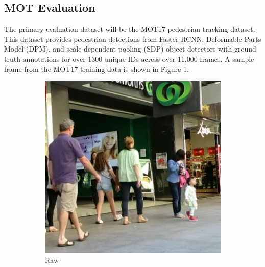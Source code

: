 \documentclass[10pt,twocolumn,letterpaper]{article}
\begin{document}
\subsection{MOT Evaluation}
The primary evaluation dataset will be the MOT17 \cite{MOT17} pedestrian tracking dataset. This dataset provides pedestrian detections from Faster-RCNN, Deformable Parts
Model (DPM), and scale-dependent pooling (SDP) object detectors with ground truth annotations for over 1300 unique IDs across over 11,000 frames. A sample frame from the MOT17 training data is shown in Figure 1.
\begin{figure}[h!]
    \centering
    \begin{subfigure}[b]{0.48\linewidth}
        \centering
        \includegraphics[width=\linewidth]{docs/reports/figs/MOT17_raw.png}
        \caption{Raw}
        \label{fig:my_label}
    \end{subfigure}
    \hfill
    \begin{subfigure}[b]{0.48\linewidth}
        \centering

\end{subfigure}
\end{figure}
\end{document}
